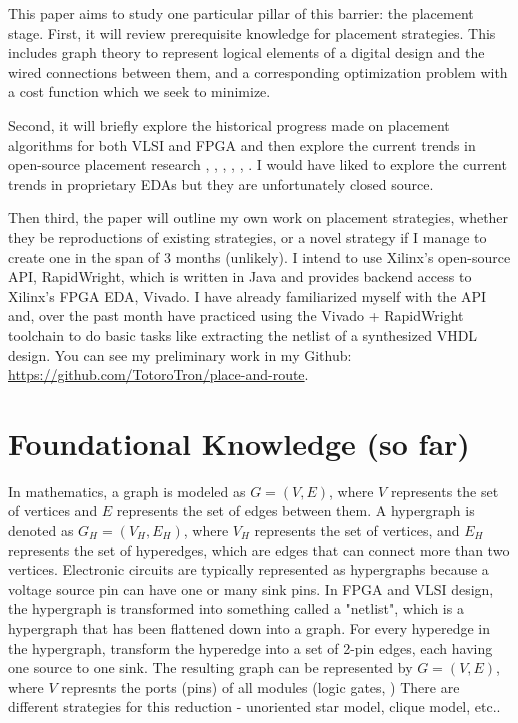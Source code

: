 \documentclass{article}
\begin{document}
    This paper aims to study one particular pillar of this barrier: the placement stage. 
    First, it will review prerequisite knowledge for placement strategies. 
    This includes graph theory to represent logical elements of a digital design and the wired connections between them, and a corresponding optimization problem with a cost function which we seek to minimize. 

    Second, it will briefly explore the historical progress made on placement algorithms for both VLSI and FPGA and then explore the current trends in open-source placement research 
    \cite{Yosys}, \cite{AMFPlacer2}, \cite{RapidLayout}, \cite{RapidStream}, \cite{DREAMPlace}, \cite{DREAMPlaceFPGA}.
    I would have liked to explore the current trends in proprietary EDAs but they are unfortunately closed source.

    Then third, the paper will outline my own work on placement strategies, whether they be reproductions of existing strategies, or a novel strategy if I manage to create one in the span of 3 months (unlikely). 
    I intend to use Xilinx's open-source API, RapidWright, which is written in Java and provides backend access to Xilinx's FPGA EDA, Vivado. 
    I have already familiarized myself with the API and, over the past month have practiced using the Vivado + RapidWright toolchain to do basic tasks like extracting the netlist of a synthesized VHDL design.
    You can see my preliminary work in my Github: \url{https://github.com/TotoroTron/place-and-route}.

\section{Foundational Knowledge (so far)}
    In mathematics, a graph is modeled as \( G = (V, E) \), where \( V \) represents the set of vertices and \( E \) represents the set of edges between them.
    A hypergraph is denoted as \( G_{H} = (V_{H}, E_{H}) \), where \( V_{H} \) represents the set of vertices, and \( E_{H} \) represents the set of hyperedges, which are edges that can connect more than two vertices.
    Electronic circuits are typically represented as hypergraphs because a voltage source pin can have one or many sink pins. 
    In FPGA and VLSI design, the hypergraph is transformed into something called a "netlist", which is a hypergraph that has been flattened down into a graph. 
    For every hyperedge in the hypergraph, transform the hyperedge into a set of 2-pin edges, each having one source to one sink.
    The resulting graph can be represented by \( G = (V, E) \), where \( V \) represnts the ports (pins) of all modules (logic gates, )
    There are different strategies for this reduction - unoriented star model, clique model, etc.. 
    \cite{AP_2000}
\end{document}
